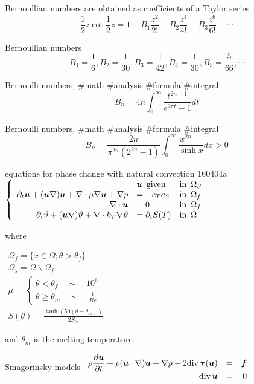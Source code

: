 Bernoullian numbers are obtained as coefficients of a Taylor series
$$
\frac{1}{2}z\cot\frac{1}{2}z=1-B_1\frac{z^2}{2!}-B_2\frac{z^4}{4!}-B_3\frac{z^6}{6!}-\cdots
$$

Bernoullian numbers
$$
B_1=\frac{1}{6},B_2=\frac{1}{30},B_3=\frac{1}{42},B_4=\frac{1}{30},B_5=\frac{5}{66},\cdots
$$

Bernoulli numbers, #math #analysis #formula #integral
$$
B_n=4n\int^\infty_0\frac{t^{2n-1}}{e^{2\pi t}-1}dt
$$

Bernoulli numbers, #math #analysis #formula #integral
$$
B_n=\frac{2n}{\pi^{2n}(2^{2n}-1)}\int^\infty_0\frac{x^{2n-1}}{\sinh x}dx>0
$$

equations for phase change with natural convection 160404a
$
\left\{
\begin{array}{rllll}
&{\boldsymbol u}\,\,\,{\rm given}&{\rm in}\,\,\,\Omega_S \\
\partial_t {\boldsymbol u}+({\boldsymbol u}\nabla){\boldsymbol u}+\nabla\cdot\mu\nabla{\boldsymbol u}+\nabla p&=-c_T {\boldsymbol e}_2&{\rm in}\,\,\,\Omega_f \\
\nabla \cdot {\boldsymbol u}&=0 &{\rm in}\,\,\,\Omega_f \\
\partial_t {\vartheta}+({\boldsymbol u}\nabla){\vartheta}+\nabla\cdot k_T\nabla {\vartheta}&=\partial_t S(T)&{\rm in}\,\,\,\Omega
\end{array}
\right.
$

where

$
\begin{array}{l}
\Omega_f=\{x\in\Omega; \theta>\theta_f\} \\
\Omega_s=\Omega\backslash\Omega_f \\
\mu=
\left\{
\begin{array}{l}
\theta<\theta_f \quad \sim \quad 10^6 \\
\theta\ge\theta_m \quad \sim \quad \frac{1}{Re}
\end{array}
\right.\\
S(\theta)=\frac{\tanh(50(\theta-\theta_m))}{2S_{te}}
\end{array}
$

and $\theta_m$ is the melting temperature


Smagorinsky models 
$
\begin{array}{rrr}
\displaystyle\rho\frac{\partial {\boldsymbol u}}{\partial t}+\rho({\boldsymbol u}\cdot\nabla){\boldsymbol u}+\nabla p-2{\rm div\,}{\boldsymbol \tau}({\boldsymbol u})&=&{\boldsymbol f} \\
{\rm div\,}{\boldsymbol u}&=&0
\end{array}
$


